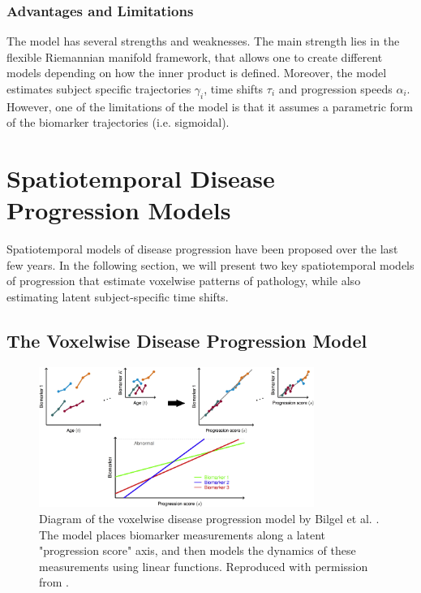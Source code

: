 \subsubsection{Advantages and Limitations}

The model has several strengths and weaknesses. The main strength lies in the flexible Riemannian manifold framework, that allows one to create different models depending on how the inner product is defined. Moreover, the model estimates subject specific trajectories $\gamma_i$, time shifts $\tau_i$ and progression speeds $\alpha_i$. However, one of the limitations of the model is that it assumes a parametric form of the biomarker trajectories (i.e. sigmoidal).

\section{Spatiotemporal Disease Progression Models}
\label{sec:bckSpa}

Spatiotemporal models of disease progression have been proposed over the last few years. In the following section, we will present two key spatiotemporal models of progression that estimate voxelwise patterns of pathology, while also estimating latent subject-specific time shifts.

\subsection{The Voxelwise Disease Progression Model}
\label{sec:bckVox}


\begin{figure}
\centering
\includegraphics[width=0.8\textwidth]{images/bilgelDiagram}
\caption[Voxelwise disease progression model by Bilgel et al. \cite{bilgel2016multivariate}]{Diagram of the voxelwise disease progression model by Bilgel et al. \cite{bilgel2016multivariate}. The model places biomarker measurements along a latent "progression score" axis, and then models the dynamics of these measurements using linear functions. Reproduced with permission from \cite{bilgel2016multivariate}.}
\label{fig:bckBil}
\end{figure}

